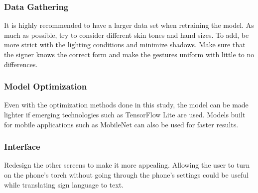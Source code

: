 \documentclass[journal]{./IEEE/IEEEtran}
\begin{document}
\subsubsection{Data Gathering}
It is highly recommended to have a larger data set when retraining the model. As much as possible, try to consider different skin tones and hand sizes. To add, be more strict with the lighting conditions and minimize shadows. Make sure that the signer knows the correct form and make the gestures uniform with little to no differences.
\newline
\subsubsection{Model Optimization}
Even with the optimization methods done in this study, the model can be made lighter if emerging technologies such as TensorFlow Lite are used. Models built for mobile applications such as MobileNet can also be used for faster results.
\newline
\subsubsection{Interface}
Redesign the other screens to make it more appealing. Allowing the user to turn on the phone's torch without going through the phone's settings could be useful while translating sign language to text.



\end{document}
